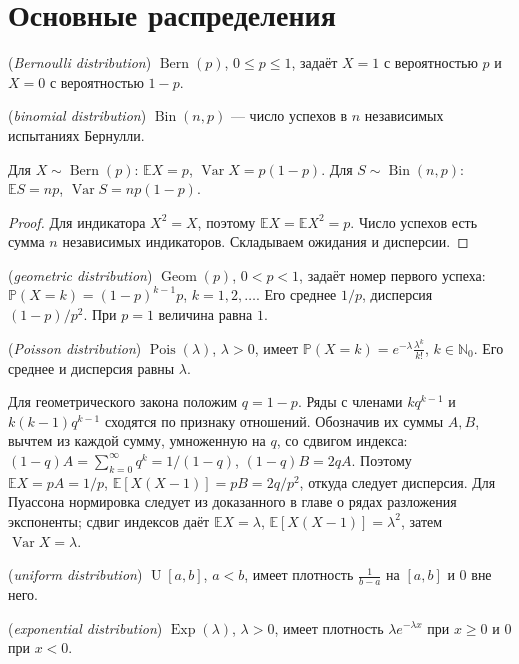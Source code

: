 \section{Основные распределения}
\begin{definition} (\emph{Bernoulli distribution}) \(\operatorname{Bern}(p)\), \(0\le p\le1\), задаёт \(X=1\) с вероятностью \(p\) и \(X=0\) с вероятностью \(1-p\). \par{} (\emph{binomial distribution}) \(\operatorname{Bin}(n,p)\) — число успехов в \(n\) независимых испытаниях Бернулли.\end{definition}
\begin{theorem}
Для \(X\sim\operatorname{Bern}(p)\): \(\mathbb EX=p\), \(\operatorname{Var}X=p(1-p)\). Для \(S\sim\operatorname{Bin}(n,p)\): \(\mathbb ES=np\), \(\operatorname{Var}S=np(1-p)\).
\end{theorem}
\begin{proof}Для индикатора \(X^2=X\), поэтому \(\mathbb EX=\mathbb EX^2=p\). Число успехов есть сумма \(n\) независимых индикаторов. Складываем ожидания и дисперсии.\end{proof}
\begin{definition} (\emph{geometric distribution}) \(\operatorname{Geom}(p)\), \(0<p<1\), задаёт номер первого успеха: \(\mathbb P(X=k)=(1-p)^{k-1}p\), \(k=1,2,\ldots\). Его среднее \(1/p\), дисперсия \((1-p)/p^2\). При \(p=1\) величина равна \(1\).\end{definition}
\begin{definition} (\emph{Poisson distribution}) \(\operatorname{Pois}(\lambda)\), \(\lambda>0\), имеет \(\mathbb P(X=k)=e^{-\lambda}\frac{\lambda^k}{k!}\), \(k\in\mathbb N_0\). Его среднее и дисперсия равны \(\lambda\).\end{definition}
Для геометрического закона положим \(q=1-p\). Ряды с членами \(kq^{k-1}\) и \(k(k-1)q^{k-1}\) сходятся по признаку отношений. Обозначив их суммы \(A,B\), вычтем из каждой сумму, умноженную на \(q\), со сдвигом индекса: \((1-q)A=\sum_{k=0}^\infty q^k=1/(1-q)\), \((1-q)B=2qA\). Поэтому \(\mathbb EX=pA=1/p\), \(\mathbb E[X(X-1)]=pB=2q/p^2\), откуда следует дисперсия. Для Пуассона нормировка следует из доказанного в главе о рядах разложения экспоненты; сдвиг индексов даёт \(\mathbb EX=\lambda\), \(\mathbb E[X(X-1)]=\lambda^2\), затем \(\operatorname{Var}X=\lambda\).
\begin{definition} (\emph{uniform distribution}) \(\operatorname U[a,b]\), \(a<b\), имеет плотность \(\frac1{b-a}\) на \([a,b]\) и \(0\) вне него. \par{} (\emph{exponential distribution}) \(\operatorname{Exp}(\lambda)\), \(\lambda>0\), имеет плотность \(\lambda e^{-\lambda x}\) при \(x\ge0\) и \(0\) при \(x<0\).\end{definition}
